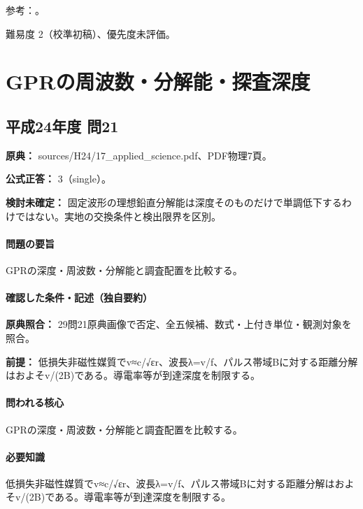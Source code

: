 \par 参考：\cite{epa_resistivity}。

\par 難易度 2（校準初稿）、優先度未評価。

\section{GPRの周波数・分解能・探査深度}

\subsection{平成24年度 問21}
\label{q:h24-reg-applied-21}

\noindent\textbf{原典：} sources/H24/17\_applied\_science.pdf、PDF物理7頁。

\textbf{公式正答：} 3（single）。

\par\textbf{検討未確定：} 固定波形の理想鉛直分解能は深度そのものだけで単調低下するわけではない。実地の交換条件と検出限界を区別。

\paragraph{問題の要旨} GPRの深度・周波数・分解能と調査配置を比較する。

\paragraph{確認した条件・記述（独自要約）}\mbox{}\par

\noindent\textbf{原典照合：} 29問21原典画像で否定、全五候補、数式・上付き単位・観測対象を照合。\par

\noindent\textbf{前提：} 低損失非磁性媒質でv≈c/√εr、波長λ=v/f、パルス帯域Bに対する距離分解はおよそv/(2B)である。導電率等が到達深度を制限する。\par

\paragraph{問われる核心} GPRの深度・周波数・分解能と調査配置を比較する。

\paragraph{必要知識} 低損失非磁性媒質でv≈c/√εr、波長λ=v/f、パルス帯域Bに対する距離分解はおよそv/(2B)である。導電率等が到達深度を制限する。

